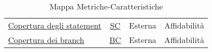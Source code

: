 \begin{table}[H]
\begin{tabular}{l | c| c| c}
			\hyperref[OCDS]{Copertura degli statement}                           & \hyperref[MCDSDF]{SC}               & Esterna       & Affidabilità            \\
			\hyperref[OCDS]{Copertura dei branch}                           & \hyperref[MCDSDF]{BC}               & Esterna       & Affidabilità            \\
			 \hline
		\end{tabular}
		\caption{Mappa Metriche-Caratteristiche}
		\label{tab:mappa_metriche_caratteristiche}
	\end{table}








